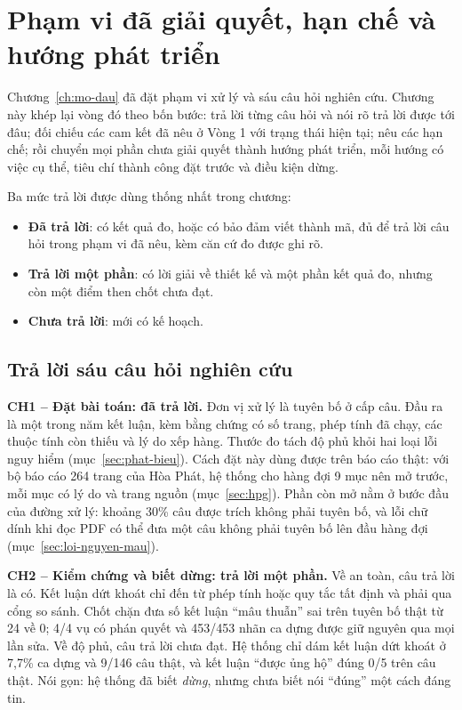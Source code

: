 \chapter{Phạm vi đã giải quyết, hạn chế và hướng phát triển}\label{ch:pham-vi}

Chương~\ref{ch:mo-dau} đã đặt phạm vi xử lý và sáu câu hỏi nghiên cứu. Chương này khép lại vòng đó theo bốn bước: trả lời từng câu hỏi và nói rõ trả lời được tới đâu; đối chiếu các cam kết đã nêu ở Vòng 1 với trạng thái hiện tại; nêu các hạn chế; rồi chuyển mọi phần chưa giải quyết thành hướng phát triển, mỗi hướng có việc cụ thể, tiêu chí thành công đặt trước và điều kiện dừng.

Ba mức trả lời được dùng thống nhất trong chương:
\begin{itemize}
\item \textbf{Đã trả lời}: có kết quả đo, hoặc có bảo đảm viết thành mã, đủ để trả lời câu hỏi trong phạm vi đã nêu, kèm căn cứ đo được ghi rõ.
\item \textbf{Trả lời một phần}: có lời giải về thiết kế và một phần kết quả đo, nhưng còn một điểm then chốt chưa đạt.
\item \textbf{Chưa trả lời}: mới có kế hoạch.
\end{itemize}

\section{Trả lời sáu câu hỏi nghiên cứu}\label{sec:tra-loi}

\textbf{CH1 – Đặt bài toán: đã trả lời.} Đơn vị xử lý là tuyên bố ở cấp câu. Đầu ra là một trong năm kết luận, kèm bằng chứng có số trang, phép tính đã chạy, các thuộc tính còn thiếu và lý do xếp hàng. Thước đo tách độ phủ khỏi hai loại lỗi nguy hiểm (mục~\ref{sec:phat-bieu}). Cách đặt này dùng được trên báo cáo thật: với bộ báo cáo 264 trang của Hòa Phát, hệ thống cho hàng đợi 9 mục nên mở trước, mỗi mục có lý do và trang nguồn (mục~\ref{sec:hpg}). Phần còn mở nằm ở bước đầu của đường xử lý: khoảng 30\% câu được trích không phải tuyên bố, và lỗi chữ dính khi đọc PDF có thể đưa một câu không phải tuyên bố lên đầu hàng đợi (mục~\ref{sec:loi-nguyen-mau}).

\textbf{CH2 – Kiểm chứng và biết dừng: trả lời một phần.} Về an toàn, câu trả lời là có. Kết luận dứt khoát chỉ đến từ phép tính hoặc quy tắc tất định và phải qua cổng so sánh. Chốt chặn đưa số kết luận “mâu thuẫn” sai trên tuyên bố thật từ 24 về 0; 4/4 vụ có phán quyết và 453/453 nhãn ca dựng được giữ nguyên qua mọi lần sửa. Về độ phủ, câu trả lời chưa đạt. Hệ thống chỉ dám kết luận dứt khoát ở 7,7\% ca dựng và 9/146 câu thật, và kết luận “được ủng hộ” đúng 0/5 trên câu thật. Nói gọn: hệ thống đã biết \emph{dừng}, nhưng chưa biết nói “đúng” một cách đáng tin.

